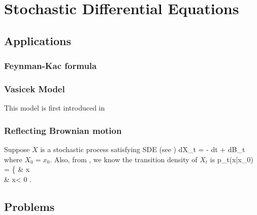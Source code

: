 \chapter{Stochastic Differential Equations}



\section{Applications}

\subsection{Feynman-Kac formula}

\subsection{Vasicek Model}

This model is first introduced in \cite{Vasicek_1977}

\subsection{Reflecting Brownian motion}

Suppose $X$ is a stochastic process satisfying SDE (see \cite{Graversen_Shiryaev_2000})
\be
dX_t = -\lm \sgn {} dt + dB_t
\ee
where $X_0 = x_0$. Also, from \cite{Karatzas_Shreve_1991}, we know the transition density of $X_t$ is 
\be
p_t(x|x_0) = \left\{  & x \\ 
 \quad \quad & x< 0
\ea\right.
\ee


\section{Problems}



